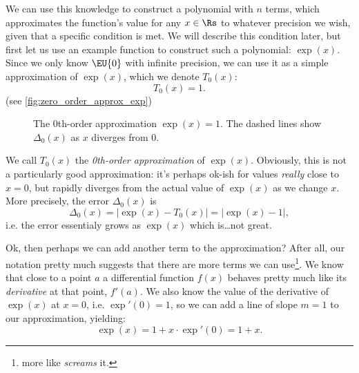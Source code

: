 We can use this knowledge to construct a polynomial with $n$ terms, which approximates the function's value for any $x\in\Rs$ to whatever precision we wish, given that a specific condition is met. We will describe this condition later, but first let us use an example function to construct such a polynomial: $\exp(x)$. Since we only know $\EU{0}$ with infinite precision, we can use it as a simple approximation of $\exp(x)$, which we denote $T_{0}(x)$:
\begin{equation}
  T_{0}(x) = 1.
  \label{eq:zero_order_approx_exp}
\end{equation}
(see \autoref{fig:zero_order_approx_exp})

\begin{figure}
  \centering
  \caption{The 0th-order approximation $\exp(x)=1$. The dashed lines show $\Delta_{0}(x)$ as $x$ diverges from $0$.}
  \label{fig:zero_order_approx_exp}
\end{figure}

We call $T_{0}(x)$ the \emph{0th-order approximation} of $\exp(x)$. Obviously, this is not a particularly good approximation: it's perhaps ok-ish for values \textit{really} close to $x=0$, but rapidly diverges from the actual value of $\exp(x)$ as we change $x$. More precisely, the error $\Delta_{0}(x)$ is
\begin{equation}
  \Delta_{0}(x) = \left| \exp(x) - T_{0}(x) \right| = \left| \exp(x)-1 \right|,
  \label{eq:exp_err_0}
\end{equation}
i.e. the error essentialy grows as $\exp(x)$ which is\dots not great.

Ok, then perhaps we can add another term to the approximation? After all, our notation pretty much suggests that there are more terms we can use\footnote{more like \textit{screams} it.}. We know that close to a point $a$ a differential function $f(x)$ behaves pretty much like its \textit{derivative} at that point, $f'(a)$. We also know the value of the derivative of $\exp(x)$ at $x=0$, i.e. $\exp'(0)=1$, so we can add a line of slope $m=1$ to our approximation, yielding:
\begin{equation}
  \exp(x) = 1 + x\cdot\exp'\left(0\right) = 1+x.
  \label{eq:first_order_approx_exp}
\end{equation}

